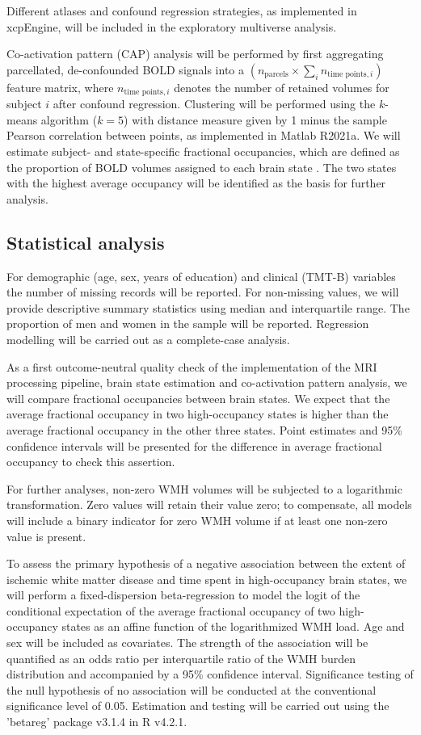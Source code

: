 Different atlases and confound regression strategies, as implemented in xcpEngine, will be included in the exploratory multiverse analysis.

Co-activation pattern (CAP) analysis will be performed by first aggregating parcellated, de-confounded BOLD signals into a $\left(n_{\text{parcels}}\times \sum_i{n_{\text{time points}, i}}\right)$ feature matrix, where $n_{\text{time points}, i}$ denotes the number of retained volumes for subject $i$ after confound regression.
Clustering will be performed using the $k$-means algorithm ($k=5$) with distance measure given by 1 minus the sample Pearson correlation between points, as implemented in Matlab R2021a.
We will estimate subject- and state-specific fractional occupancies, which are defined as the proportion of BOLD volumes assigned to each brain state \citep{Vidaurre2018-pb}. 
The two states with the highest average occupancy will be identified as the basis for further analysis.


\subsection{Statistical analysis}
For demographic (age, sex, years of education) and clinical (TMT-B) variables the number of missing records will be reported.
For non-missing values, we will provide descriptive summary statistics using median and interquartile range.
The proportion of men and women in the sample will be reported. Regression modelling will be carried out as a complete-case analysis.

As a first outcome-neutral quality check of the implementation of the MRI processing pipeline, brain state estimation and co-activation pattern analysis, we will compare fractional occupancies between brain states.
We expect that the average fractional occupancy in two high-occupancy states is higher than the average fractional occupancy in the other three states.
Point estimates and 95\% confidence intervals will be presented for the difference in average fractional occupancy to check this assertion.

For further analyses, non-zero WMH volumes will be subjected to a logarithmic transformation.
Zero values will retain their value zero; to compensate, all models will include a binary indicator for zero WMH volume if at least one non-zero value is present.

To assess the primary hypothesis of a negative association between the extent of ischemic white matter disease and time spent in high-occupancy brain states, we will perform a fixed-dispersion beta-regression to model the logit of the conditional expectation of the average fractional occupancy of two high-occupancy states as an affine function of the logarithmized WMH load.
Age and sex will be included as covariates.
The strength of the association will be quantified as an odds ratio per interquartile ratio of the WMH burden distribution and accompanied by a 95\% confidence interval.
Significance testing of the null hypothesis of no association will be conducted at the conventional significance level of 0.05.
Estimation and testing will be carried out using the 'betareg' package v3.1.4 in R v4.2.1.

